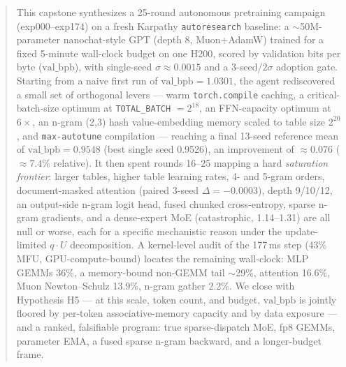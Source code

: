 \documentclass{article}
\newcommand{\valbpb}{\mathrm{val\_bpb}}
\begin{document}

\printAffiliationsAndNotice{}

\begin{abstract}
This capstone synthesizes a 25-round autonomous pretraining campaign (exp000--exp174) on a fresh Karpathy \texttt{autoresearch} baseline: a $\sim$50M-parameter nanochat-style GPT (depth 8, Muon+AdamW) trained for a fixed 5-minute wall-clock budget on one H200, scored by validation bits per byte ($\valbpb$), with single-seed $\sigma \approx 0.0015$ and a 3-seed/$2\sigma$ adoption gate. Starting from a naive first run of $\valbpb = 1.0301$, the agent rediscovered a small set of orthogonal levers --- warm \texttt{torch.compile} caching, a critical-batch-size optimum at \texttt{TOTAL\_BATCH} $= 2^{18}$, an FFN-capacity optimum at $6\times$, an n-gram (2,3) hash value-embedding memory scaled to table size $2^{20}$, and \texttt{max-autotune} compilation --- reaching a final 13-seed reference mean of $\valbpb = 0.9548$ (best single seed 0.9526), an improvement of $\approx 0.076$ ($\approx 7.4\%$ relative). It then spent rounds 16--25 mapping a hard \emph{saturation frontier}: larger tables, higher table learning rates, 4- and 5-gram orders, document-masked attention (paired 3-seed $\Delta = -0.0003$), depth 9/10/12, an output-side n-gram logit head, fused chunked cross-entropy, sparse n-gram gradients, and a dense-expert MoE (catastrophic, 1.14--1.31) are all null or worse, each for a specific mechanistic reason under the update-limited $q \cdot U$ decomposition. A kernel-level audit of the 177\,ms step (43\% MFU, GPU-compute-bound) locates the remaining wall-clock: MLP GEMMs 36\%, a memory-bound non-GEMM tail $\sim$29\%, attention 16.6\%, Muon Newton--Schulz 13.9\%, n-gram gather 2.2\%. We close with Hypothesis H5 --- at this scale, token count, and budget, $\valbpb$ is jointly floored by per-token associative-memory capacity and by data exposure --- and a ranked, falsifiable program: true sparse-dispatch MoE, fp8 GEMMs, parameter EMA, a fused sparse n-gram backward, and a longer-budget frame.
\end{abstract}
\end{document}

